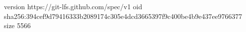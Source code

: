 version https://git-lfs.github.com/spec/v1
oid sha256:394cef9d79416333b2089174c305e4dcd3665397f9c400be4b9e437ee9766377
size 5566
